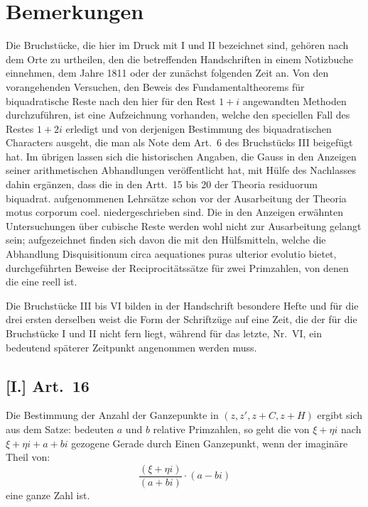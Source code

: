 \documentclass[12pt,a4paper]{article}
\begin{document}
\section*{Bemerkungen}

Die Bruchstücke, die hier im Druck mit I und II bezeichnet sind, gehören nach dem Orte zu urtheilen, den die betreffenden Handschriften in einem Notizbuche einnehmen, dem Jahre 1811 oder der zunächst folgenden Zeit an. Von den vorangehenden Versuchen, den Beweis des Fundamentaltheorems für biquadratische Reste nach den hier für den Rest $1+i$ angewandten Methoden durchzuführen, ist eine Aufzeichnung vorhanden, welche den speciellen Fall des Restes $1+2i$ erledigt und von derjenigen Bestimmung des biquadratischen Characters ausgeht, die man als Note dem Art.~6 des Bruchstücks III beigefügt hat. Im übrigen lassen sich die historischen Angaben, die Gauss in den Anzeigen seiner arithmetischen Abhandlungen veröffentlicht hat, mit Hülfe des Nachlasses dahin ergänzen, dass die in den Artt.~15 bis 20 der Theoria residuorum biquadrat. aufgenommenen Lehrsätze schon vor der Ausarbeitung der Theoria motus corporum coel. niedergeschrieben sind. Die in den Anzeigen erwähnten Untersuchungen über cubische Reste werden wohl nicht zur Ausarbeitung gelangt sein; aufgezeichnet finden sich davon die mit den Hülfsmitteln, welche die Abhandlung Disquisitionum circa aequationes puras ulterior evolutio bietet, durchgeführten Beweise der Reciprocitätssätze für zwei Primzahlen, von denen die eine reell ist.

Die Bruchstücke III bis VI bilden in der Handschrift besondere Hefte und für die drei ersten derselben weist die Form der Schriftzüge auf eine Zeit, die der für die Bruchstücke I und II nicht fern liegt, während für das letzte, Nr.~VI, ein bedeutend späterer Zeitpunkt angenommen werden muss.

\subsection*{[I.] Art.~16}

Die Bestimmung der Anzahl der Ganzepunkte in $(z, z', z + C, z + H)$ ergibt sich aus dem Satze: bedeuten $a$ und $b$ relative Primzahlen, so geht die von $\xi + \eta i$ nach $\xi + \eta i + a + bi$ gezogene Gerade durch Einen Ganzepunkt, wenn der imaginäre Theil von:
\[
\frac{(\xi + \eta i)}{(a + bi)} \cdot (a - bi)
\]
eine ganze Zahl ist.
\end{document}
